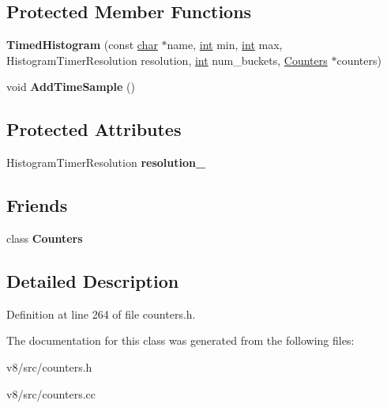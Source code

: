\subsection*{Protected Member Functions}
\begin{DoxyCompactItemize}
\item 
\mbox{\label{classv8_1_1internal_1_1TimedHistogram_ac4b26a90c87f3f8e4c67c5ceed7690a0}} 
{\bfseries Timed\+Histogram} (const \mbox{\hyperlink{classchar}{char}} $\ast$name, \mbox{\hyperlink{classint}{int}} min, \mbox{\hyperlink{classint}{int}} max, Histogram\+Timer\+Resolution resolution, \mbox{\hyperlink{classint}{int}} num\+\_\+buckets, \mbox{\hyperlink{classv8_1_1internal_1_1Counters}{Counters}} $\ast$counters)
\item 
\mbox{\label{classv8_1_1internal_1_1TimedHistogram_a4e1b8bee06b67537e579fe839e309445}} 
void {\bfseries Add\+Time\+Sample} ()
\end{DoxyCompactItemize}
\subsection*{Protected Attributes}
\begin{DoxyCompactItemize}
\item 
\mbox{\label{classv8_1_1internal_1_1TimedHistogram_a95a77eee708e2b6526229fe3bcf82076}} 
Histogram\+Timer\+Resolution {\bfseries resolution\+\_\+}
\end{DoxyCompactItemize}
\subsection*{Friends}
\begin{DoxyCompactItemize}
\item 
\mbox{\label{classv8_1_1internal_1_1TimedHistogram_a5545327f141103b96b160ddc48274bc0}} 
class {\bfseries Counters}
\end{DoxyCompactItemize}


\subsection{Detailed Description}


Definition at line 264 of file counters.\+h.



The documentation for this class was generated from the following files\+:\begin{DoxyCompactItemize}
\item 
v8/src/counters.\+h\item 
v8/src/counters.\+cc\end{DoxyCompactItemize}
